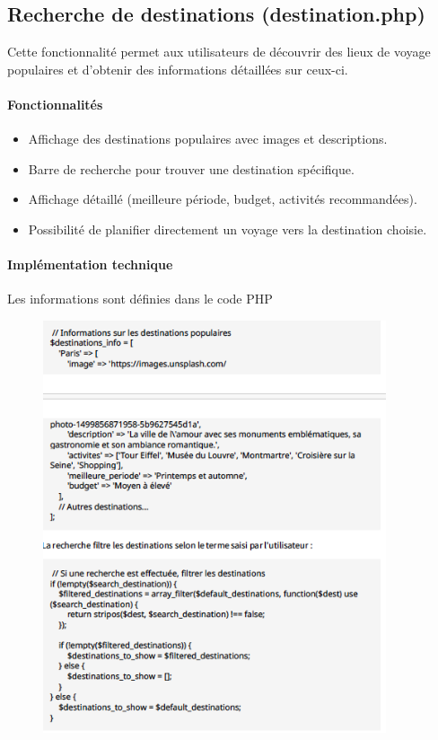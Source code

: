 \documentclass[a4paper,12pt]{article}
\begin{document}
\subsection{Recherche de destinations (destination.php)}

Cette fonctionnalité permet aux utilisateurs de découvrir des lieux de voyage populaires et d’obtenir des informations détaillées sur ceux-ci.

\paragraph{Fonctionnalités}
\begin{itemize}
  \item Affichage des destinations populaires avec images et descriptions.
  \item Barre de recherche pour trouver une destination spécifique.
  \item Affichage détaillé (meilleure période, budget, activités recommandées).
  \item Possibilité de planifier directement un voyage vers la destination choisie.
\end{itemize}

\paragraph{Implémentation technique}
Les informations sont définies dans le code PHP

\begin{figure}[H]
  \centering
  \includegraphics[width=0.9\textwidth]{capture8.png}
\end{figure}
\end{document}
